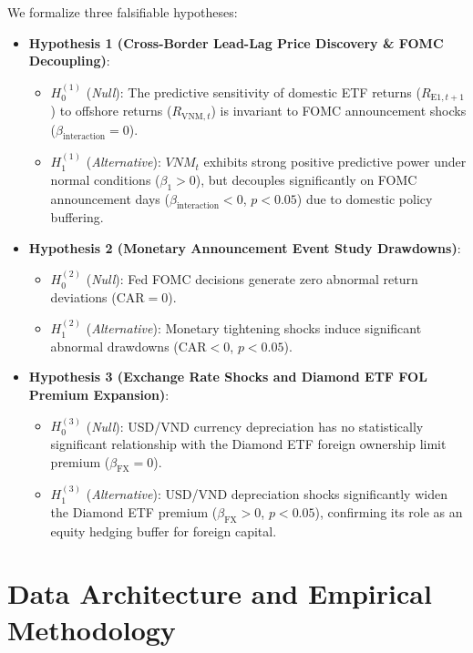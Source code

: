 \documentclass{article}
\begin{document}
We formalize three falsifiable hypotheses:
\begin{itemize}
    \item \textbf{Hypothesis 1 (Cross-Border Lead-Lag Price Discovery \& FOMC Decoupling)}:
    \begin{itemize}
        \item $H_0^{(1)}$ (\textit{Null}): The predictive sensitivity of domestic ETF returns ($R_{\text{E1}, t+1}$) to offshore returns ($R_{\text{VNM}, t}$) is invariant to FOMC announcement shocks ($\beta_{\text{interaction}} = 0$).
        \item $H_1^{(1)}$ (\textit{Alternative}): $VNM_t$ exhibits strong positive predictive power under normal conditions ($\beta_1 > 0$), but decouples significantly on FOMC announcement days ($\beta_{\text{interaction}} < 0$, $p < 0.05$) due to domestic policy buffering.
    \end{itemize}
    \item \textbf{Hypothesis 2 (Monetary Announcement Event Study Drawdowns)}:
    \begin{itemize}
        \item $H_0^{(2)}$ (\textit{Null}): Fed FOMC decisions generate zero abnormal return deviations ($\text{CAR} = 0$).
        \item $H_1^{(2)}$ (\textit{Alternative}): Monetary tightening shocks induce significant abnormal drawdowns ($\text{CAR} < 0$, $p < 0.05$).
    \end{itemize}
    \item \textbf{Hypothesis 3 (Exchange Rate Shocks and Diamond ETF FOL Premium Expansion)}:
    \begin{itemize}
        \item $H_0^{(3)}$ (\textit{Null}): USD/VND currency depreciation has no statistically significant relationship with the Diamond ETF foreign ownership limit premium ($\beta_{\text{FX}} = 0$).
        \item $H_1^{(3)}$ (\textit{Alternative}): USD/VND depreciation shocks significantly widen the Diamond ETF premium ($\beta_{\text{FX}} > 0$, $p < 0.05$), confirming its role as an equity hedging buffer for foreign capital.
    \end{itemize}
\end{itemize}

\section{Data Architecture and Empirical Methodology}
\label{sec:data_methods}
\end{document}
